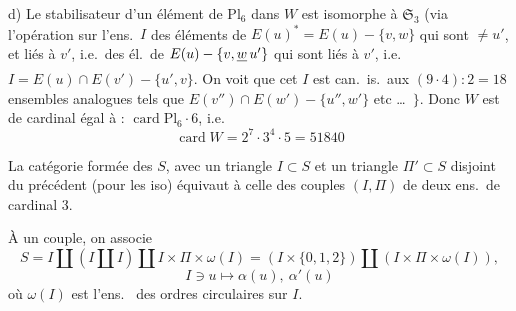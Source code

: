 \documentclass[11pt,a4paper]{article}
\begin{document}

d) Le stabilisateur d'un élément de $\mathrm{Pl}_6$   dans $W$ est
isomorphe à $\mathfrak{S}_3$ (via l'opération sur l'ens.\ $I$  des éléments de  $E(u)^{*} =
E(u) - \lbrace v, w \rbrace$ qui sont $\neq u'$,  et liés
à $v'$, i.e.\ des él.\ de $E(u) - \lbrace v, \struck{w}\, u' \rbrace$ qui sont
liés à $v'$, i.e.\ $I = E(u) \cap E(v') - \lbrace u', v \rbrace$. On voit
 que cet $I$ est can.\ is.\ aux $(9 \cdot 4) : 2 = 18$ ensembles
analogues tels que $E(v'') \cap E(w') - \lbrace u'', w' \rbrace$ etc
\ldots\ $\rbrace$. Donc $W$ est de cardinal égal à : $\operatorname{card}
\mathrm{Pl}_6 \cdot 6$, i.e.
\[
\operatorname{card} W = 2^7 \cdot 3^4 \cdot 5 = 51840
\]

 


La catégorie formée des $S$, avec un triangle $I \subset S$ et un triangle
$\Pi' \subset S$ disjoint du précédent (pour les iso) équivaut à celle des
couples $(I, \Pi)$ de deux ens.\ de cardinal 3.

À un  couple, on associe
\[
S = I \amalg (I \amalg I) \amalg I \times \Pi \times \omega(I)
= (I \times \lbrace 0, 1, 2 \rbrace) \amalg (I \times \Pi \times \omega(I)),
\]
\[
I \ni u \longmapsto \alpha(u), \ \alpha'(u)
\]
où $\omega(I)$  est l'ens.\  des ordres circulaires sur $I$.

\end{document}
